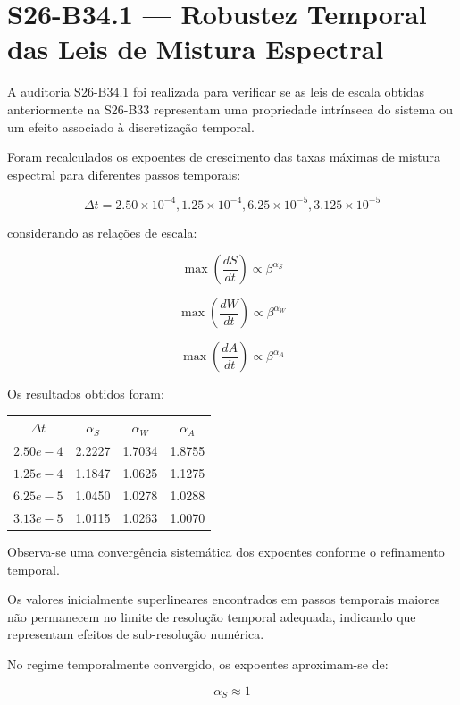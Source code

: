 \documentclass[11pt,a4paper]{article}
\begin{document}
\section{S26-B34.1 — Robustez Temporal das Leis de Mistura Espectral}

A auditoria S26-B34.1 foi realizada para verificar se as leis
de escala obtidas anteriormente na S26-B33 representam uma
propriedade intrínseca do sistema ou um efeito associado à
discretização temporal.

Foram recalculados os expoentes de crescimento das taxas máximas
de mistura espectral para diferentes passos temporais:

\[
\Delta t =
2.50\times10^{-4},
1.25\times10^{-4},
6.25\times10^{-5},
3.125\times10^{-5}
\]

considerando as relações de escala:

\[
\max\left(\frac{dS}{dt}\right)
\propto \beta^{\alpha_S}
\]

\[
\max\left(\frac{dW}{dt}\right)
\propto \beta^{\alpha_W}
\]

\[
\max\left(\frac{dA}{dt}\right)
\propto \beta^{\alpha_A}
\]

Os resultados obtidos foram:

\begin{table}[h]
\centering
\begin{tabular}{cccc}
\toprule
$\Delta t$ &
$\alpha_S$ &
$\alpha_W$ &
$\alpha_A$
\\
\midrule
$2.50e-4$ &
2.2227 &
1.7034 &
1.8755
\\

$1.25e-4$ &
1.1847 &
1.0625 &
1.1275
\\

$6.25e-5$ &
1.0450 &
1.0278 &
1.0288
\\

$3.13e-5$ &
1.0115 &
1.0263 &
1.0070
\\
\bottomrule
\end{tabular}
\end{table}


Observa-se uma convergência sistemática dos expoentes conforme
o refinamento temporal.

Os valores inicialmente superlineares encontrados em passos
temporais maiores não permanecem no limite de resolução temporal
adequada, indicando que representam efeitos de sub-resolução
numérica.


No regime temporalmente convergido, os expoentes aproximam-se de:

\[
\alpha_S \approx 1
\]
\end{document}
